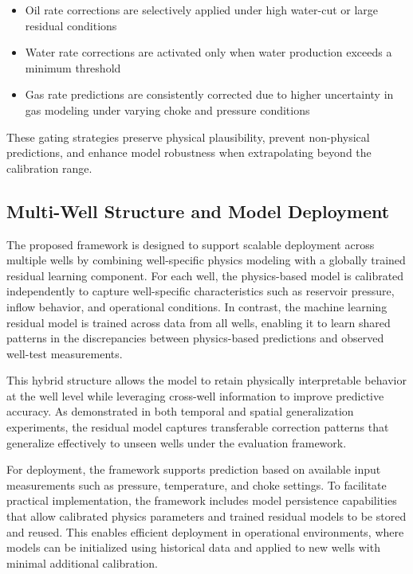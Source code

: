\documentclass[12pt,APA]{uomthesis}
\begin{document}
\begin{itemize}
    \item Oil rate corrections are selectively applied under high water-cut or large residual conditions
    \item Water rate corrections are activated only when water production exceeds a minimum threshold
    \item Gas rate predictions are consistently corrected due to higher uncertainty in gas modeling under varying choke and pressure conditions
\end{itemize}

These gating strategies preserve physical plausibility, prevent non-physical predictions, and enhance model robustness when extrapolating beyond the calibration range.

\subsection{Multi-Well Structure and Model Deployment}
The proposed framework is designed to support scalable deployment across multiple wells by combining well-specific physics modeling with a globally trained residual learning component. For each well, the physics-based model is calibrated independently to capture well-specific characteristics such as reservoir pressure, inflow behavior, and operational conditions. In contrast, the machine learning residual model is trained across data from all wells, enabling it to learn shared patterns in the discrepancies between physics-based predictions and observed well-test measurements.

This hybrid structure allows the model to retain physically interpretable behavior at the well level while leveraging cross-well information to improve predictive accuracy. As demonstrated in both temporal and spatial generalization experiments, the residual model captures transferable correction patterns that generalize effectively to unseen wells under the  evaluation framework.

For deployment, the framework supports prediction based on available input measurements such as pressure, temperature, and choke settings. 
To facilitate practical implementation, the framework includes model persistence capabilities that allow calibrated physics parameters and trained residual models to be stored and reused. This enables efficient deployment in operational environments, where models can be initialized using historical data and applied to new wells with minimal additional calibration.
\end{document}
